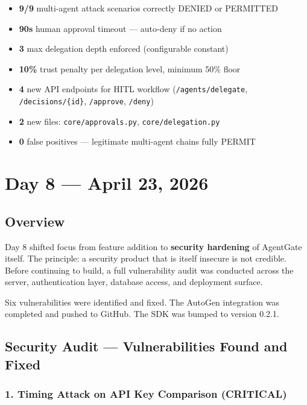 \documentclass[12pt, a4paper]{article}
\begin{document}
\begin{itemize}[noitemsep]
  \item \textbf{9/9} multi-agent attack scenarios correctly DENIED or PERMITTED
  \item \textbf{90s} human approval timeout — auto-deny if no action
  \item \textbf{3} max delegation depth enforced (configurable constant)
  \item \textbf{10\%} trust penalty per delegation level, minimum 50\% floor
  \item \textbf{4} new API endpoints for HITL workflow
    (\texttt{/agents/delegate}, \texttt{/decisions/\{id\}},
    \texttt{/approve}, \texttt{/deny})
  \item \textbf{2} new files: \texttt{core/approvals.py},
    \texttt{core/delegation.py}
  \item \textbf{0} false positives — legitimate multi-agent chains fully PERMIT
\end{itemize}

\section{Day 8 — April 23, 2026}

\subsection{Overview}

Day 8 shifted focus from feature addition to \textbf{security hardening} of
AgentGate itself. The principle: a security product that is itself insecure is
not credible. Before continuing to build, a full vulnerability audit was
conducted across the server, authentication layer, database access, and
deployment surface.

Six vulnerabilities were identified and fixed. The AutoGen integration was
completed and pushed to GitHub. The SDK was bumped to version 0.2.1.

\subsection{Security Audit — Vulnerabilities Found and Fixed}

\subsubsection{1. Timing Attack on API Key Comparison (CRITICAL)}
\end{document}
